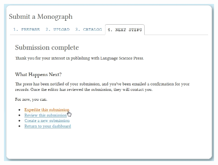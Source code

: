 \begin{figure}[h] \centering
\includegraphics[width=1\textwidth]{./img/fastLane.jpg}
\label{fig:fastLane}
\end{figure}

